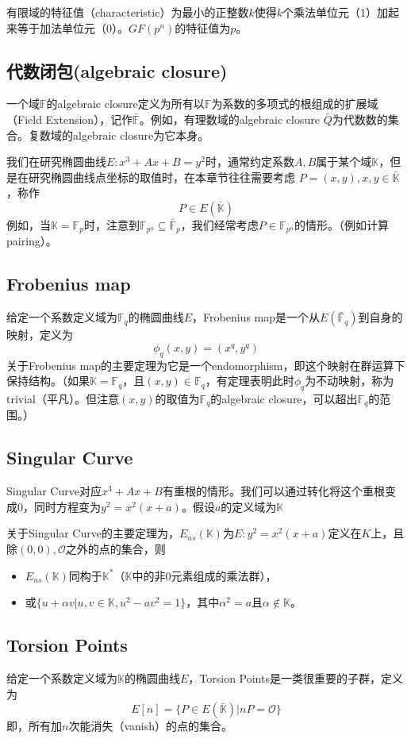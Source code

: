 \documentclass[12pt]{article}
\newcommand{\ec}{椭圆曲线}
\newcommand{\oo}{\mathcal{O}}
\newcommand{\fp}{\mathbb{F}_p}
\newcommand{\fpn}{\mathbb{F}_{p^n}}
\newcommand{\fq}{\mathbb{F}_q}
\begin{document}
有限域的特征值（characteristic）为最小的正整数$k$使得$k$个乘法单位元（1）加起来等于加法单位元（0）。$GF(p^n)$的特征值为$p$。
\subsection{代数闭包(algebraic closure)}
一个域$\mathbb{F}$的algebraic closure定义为所有以$\mathbb{F}$为系数的多项式的根组成的扩展域（Field Extension），记作$\bar{\mathbb{F}}$。例如，有理数域的algebraic closure $\bar{Q}$为代数数的集合。复数域的algebraic closure为它本身。

我们在研究\ec $E:x^3+Ax+B=y^2$时，通常约定系数$A,B$属于某个域$\mathbb{K}$，但是在研究\ec 点坐标的取值时，在本章节往往需要考虑
$P = (x,y), x,y \in \bar{\mathbb{K}}$，称作
$$P \in E(\bar{\mathbb{K}})$$
例如，当$\mathbb{K}=\fp$时，注意到$\fpn \subseteq \bar{\mathbb{F}}_p$，我们经常考虑$P \in \fpn$的情形。（例如计算pairing）。
\subsection{Frobenius map}
给定一个系数定义域为$\mathbb{F}_q$的椭圆曲线$E$，Frobenius map是一个从$E(\bar{\mathbb{F}}_q)$到自身的映射，定义为
$$\phi_q(x,y) = (x^q,y^q)$$
关于Frobenius map的主要定理为它是一个endomorphism，即这个映射在群运算下保持结构。（如果$\mathbb{K}=\fq$，且$(x,y) \in \fq$，有定理表明此时$\phi_q$为不动映射，称为trivial（平凡）。但注意$(x,y)$的取值为$\fq$的algebraic closure，可以超出$\fq$的范围。）
\subsection{Singular Curve}
Singular Curve对应$x^3+Ax+B$有重根的情形。我们可以通过转化将这个重根变成0，同时方程变为$y^2=x^2(x+a)$。假设$a$的定义域为$\mathbb{K}$

关于Singular Curve的主要定理为，$E_{ns}(\mathbb{K})$为$E:y^2=x^2(x+a)$定义在$K$上，且除$(0,0),\oo$之外的点的集合，则
\begin{itemize}
\item $E_{ns}(\mathbb{K})$同构于$\mathbb{K}^*$（$\mathbb{K}$中的非0元素组成的乘法群），
\item 或$\{u+\alpha v |u,v \in \mathbb{K}, u^2-av^2 = 1\}$，其中$\alpha^2 = a$且$\alpha \notin \mathbb{K}$。
\end{itemize}
\subsection{Torsion Points}
给定一个系数定义域为$\mathbb{K}$的椭圆曲线$E$，Torsion Points是一类很重要的子群，定义为
$$E[n] = \{P \in E(\bar{\mathbb{K}})| nP = \oo \}$$
即，所有加$n$次能消失（vanish）的点的集合。
\end{document}
